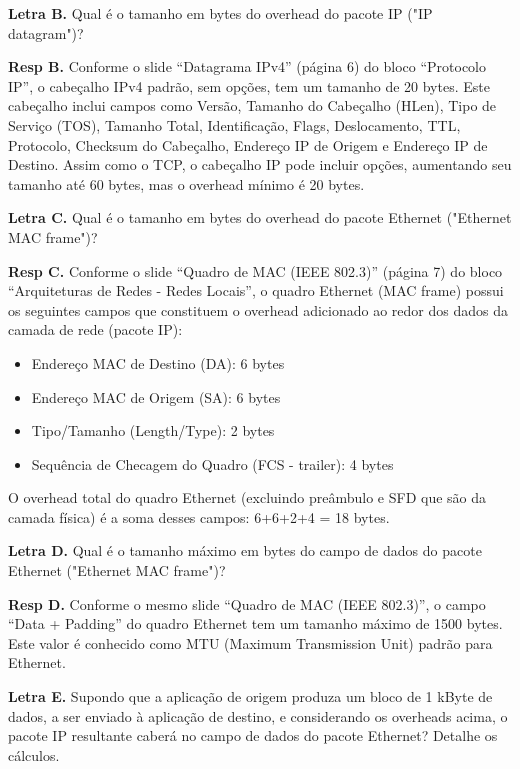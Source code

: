 \textbf{Letra B.} Qual é o tamanho em bytes do overhead do pacote IP ("IP datagram")?
\newline

\textbf{Resp B.} Conforme o slide “Datagrama IPv4” (página 6) do bloco “Protocolo IP”, o cabeçalho IPv4 padrão, sem opções, tem um tamanho de 20 bytes. Este cabeçalho inclui campos como Versão, Tamanho do Cabeçalho (HLen), Tipo de Serviço (TOS), Tamanho Total, Identificação, Flags, Deslocamento, TTL, Protocolo, Checksum do Cabeçalho, Endereço IP de Origem e Endereço IP de Destino. Assim como o TCP, o cabeçalho IP pode incluir opções, aumentando seu tamanho até 60 bytes, mas o overhead mínimo é 20 bytes.
\newline

\textbf{Letra C.} Qual é o tamanho em bytes do overhead do pacote Ethernet ("Ethernet MAC frame")?
\newline

\textbf{Resp C.} Conforme o slide “Quadro de MAC (IEEE 802.3)” (página 7) do bloco “Arquiteturas de Redes - Redes Locais”, o quadro Ethernet (MAC frame) possui os seguintes campos que constituem o overhead adicionado ao redor dos dados da camada de rede (pacote IP):

\begin{itemize}
    \item Endereço MAC de Destino (DA): 6 bytes
    \item Endereço MAC de Origem (SA): 6 bytes
    \item Tipo/Tamanho (Length/Type): 2 bytes
    \item Sequência de Checagem do Quadro (FCS - trailer): 4 bytes
\end{itemize}

O overhead total do quadro Ethernet (excluindo preâmbulo e SFD que são da camada física) é a soma desses campos: 6+6+2+4 = 18 bytes.
\newline

\textbf{Letra D.} Qual é o tamanho máximo em bytes do campo de dados do pacote Ethernet ("Ethernet MAC frame")?
\newline

\textbf{Resp D.} Conforme o mesmo slide “Quadro de MAC (IEEE 802.3)”, o campo “Data + Padding” do quadro Ethernet tem um tamanho máximo de 1500 bytes. Este valor é conhecido como MTU (Maximum Transmission Unit) padrão para Ethernet.
\newline

\textbf{Letra E.} Supondo que a aplicação de origem produza um bloco de 1 kByte de dados, a ser enviado à aplicação de destino, e considerando os overheads acima, o pacote IP resultante caberá no campo de dados do pacote Ethernet? Detalhe os cálculos.
\newline

